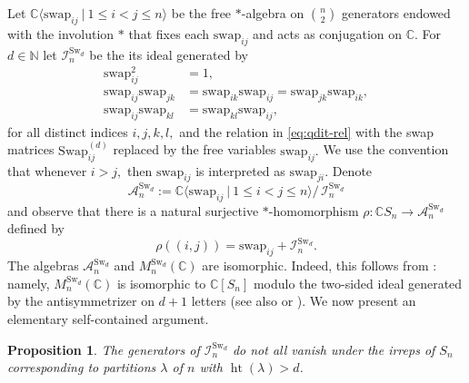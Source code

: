 \documentclass[12pt,dvipsnames,accepted=2016-08-18,a4paper,onecolumn]{quantumarticle}
\DeclareMathOperator{\het}{ht}
\numberwithin{equation}{section}
\newcommand{\NN}{\mathbb N}
\newcommand{\CC}{\mathbb C}
\newtheorem{proposition}[theorem]{Proposition}
\theoremstyle{definition}
\begin{document}
Let $\CC\langle \text{swap}_{ij} \ | \ 1 \leq i < j \leq n\rangle$ be the free $*$-algebra on $\binom{n}{2}$ generators endowed with the involution $*$ that fixes each $\text{swap}_{ij}$ and acts as conjugation on $\CC.$ For $d\in\NN$ let $\mathcal{I}^{\text{Sw}_d}_n$ be the its ideal generated by
	\begin{equation}\label{eq:from sn}
	\begin{split}
		\text{swap}_{ij}^2 &= 1,\\
		\text{swap}_{ij}\text{swap}_{jk} &= \text{swap}_{ik}\text{swap}_{ij} = \text{swap}_{jk}\text{swap}_{ik},\\
        \text{swap}_{ij}\text{swap}_{kl} &= \text{swap}_{kl}\text{swap}_{ij},
	\end{split}
\end{equation}
	for all distinct indices $i,j,k,l,$
 and the relation in \eqref{eq:qdit-rel} with the swap matrices $\text{Swap}^{(d)}_{ij}$ replaced by the free variables $\text{swap}_{ij}.$
 We use the convention that whenever $i>j,$ then $\text{swap}_{ij}$ is interpreted as $\text{swap}_{ji}.$ Denote
	$$
	\mathcal{A}^{\text{Sw}_d}_n := \CC\langle \text{swap}_{ij} \ | \ 1 \leq i < j \leq n\rangle /\, \mathcal{I}^{\text{Sw}_d}_n
	$$
	and observe that there is a natural surjective $*$-homomorphism $\rho: \CC S_n \to \mathcal{A}^{\text{Sw}_d}_n$ defined by
	\begin{equation}\label{eq:eval}
		\rho((i,j)) = \text{swap}_{ij}+\mathcal{I}^{\text{Sw}_d}_n.
	\end{equation}
The algebras $\mathcal{A}^{\text{Sw}_d}_n$ and $M^{\text{Sw}_d}_n(\mathbb{C})$ are isomorphic.
{Indeed, this follows from \cite[Theorem 11.6.1]{Probook}: namely, $M^{\text{Sw}_d}_n(\mathbb{C})$ is isomorphic to $\CC[S_n]$ modulo the two-sided ideal generated by the antisymmetrizer on $d+1$ letters (see also \cite[Theorem 4.2]{dCP} or \cite[Theorem 2.8.1]{Gri}). We now present an elementary self-contained argument.
}


\begin{proposition}\label{prop: geq d}
	The generators of $\mathcal{I}^{\text{Sw}_d}_n$ do not all vanish under the irreps of $S_n$ corresponding to partitions 
	$\lambda$ of $n$ 
with $\het(\lambda)> d$.
\end{proposition}
\end{document}
